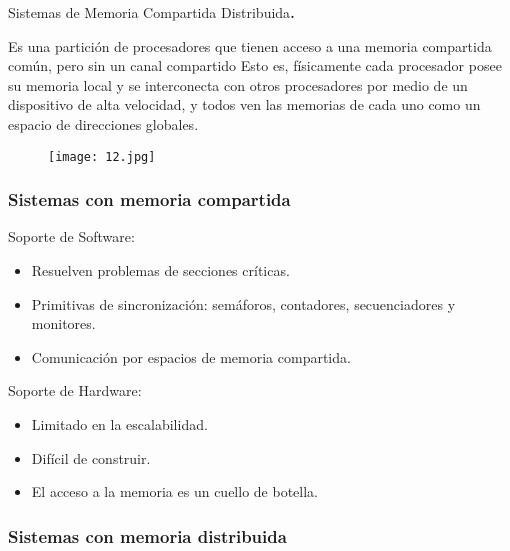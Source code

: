 \begin{center}
Sistemas de Memoria Compartida Distribuida\textbf{{\Large .}}
\end{center}

Es una partición de procesadores que tienen acceso a una memoria compartida común, pero sin un canal compartido Esto es, físicamente cada procesador posee su memoria local y se interconecta con otros procesadores por medio de un dispositivo de alta velocidad, y todos ven las memorias de cada uno como un espacio de direcciones globales.

\begin{figure}[h!]
		\centering
		{\texttt{[image: 12.jpg]}\par} \vspace{1cm}
\end{figure}

\begin{center}
\subsubsection{Sistemas con memoria compartida}
\end{center}
\vspace{1cm}

Soporte de Software:

\begin{itemize}
	\item Resuelven problemas de secciones críticas.
	\item Primitivas de sincronización: semáforos, contadores, secuenciadores y monitores.
	\item Comunicación por espacios de memoria compartida.
\end{itemize}
\vspace{1cm}

Soporte de Hardware:

\begin{itemize}
	\item Limitado en la escalabilidad.
	\item Difícil de construir.
	\item El acceso a la memoria es un cuello de botella.
\end{itemize}
\vspace{1cm}

\begin{center}
\subsubsection{Sistemas con memoria distribuida}
\end{center}

